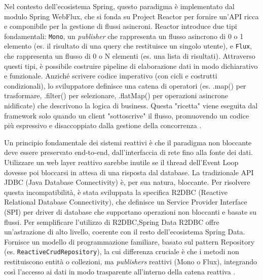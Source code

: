 \documentclass[12pt,a4paper,openright,twoside]{book}
\begin{document}
Nel contesto dell'ecosistema Spring, questo paradigma è implementato dal modulo Spring WebFlux, che si fonda su Project Reactor per fornire un'API ricca e componibile per la gestione di flussi asincroni. Reactor introduce due tipi fondamentali: \texttt{Mono}, un \textit{publisher} che rappresenta un flusso asincrono di 0 o 1 elemento (es. il risultato di una query che restituisce un singolo utente), e \texttt{Flux}, che rappresenta un flusso di 0 o N elementi (es. una lista di risultati). Attraverso questi tipi, è possibile costruire pipeline di elaborazione dati in modo dichiarativo e funzionale. Anziché scrivere codice imperativo (con cicli e costrutti condizionali), lo sviluppatore definisce una catena di operatori (es. .map() per trasformare, .filter() per selezionare, .flatMap() per operazioni asincrone nidificate) che descrivono la logica di business. Questa "ricetta" viene eseguita dal framework solo quando un client "sottoscrive" il flusso, promuovendo un codice più espressivo e disaccoppiato dalla gestione della concorrenza \cite{spring_reactive}.

Un principio fondamentale dei sistemi reattivi è che il paradigma non bloccante deve essere preservato end-to-end, dall'interfaccia di rete fino alla fonte dei dati. Utilizzare un web layer reattivo sarebbe inutile se il thread dell'Event Loop dovesse poi bloccarsi in attesa di una risposta dal database. La tradizionale API JDBC (Java Database Connectivity) è, per sua natura, bloccante. Per risolvere questa incompatibilità, è stata sviluppata la specifica R2DBC (Reactive Relational Database Connectivity), che definisce un Service Provider Interface (SPI) per driver di database che supportano operazioni non bloccanti e basate su flussi. Per semplificare l'utilizzo di R2DBC,Spring Data R2DBC offre un'astrazione di alto livello, coerente con il resto dell'ecosistema Spring Data. Fornisce un modello di programmazione familiare, basato sul pattern Repository (es. \texttt{ReactiveCrudRepository}), la cui differenza cruciale è che i metodi non restituiscono entità o collezioni, ma \textit{publishers} reattivi (Mono o Flux), integrando così l'accesso ai dati in modo trasparente all'interno della catena reattiva \cite{spring_reactive}.
\end{document}
